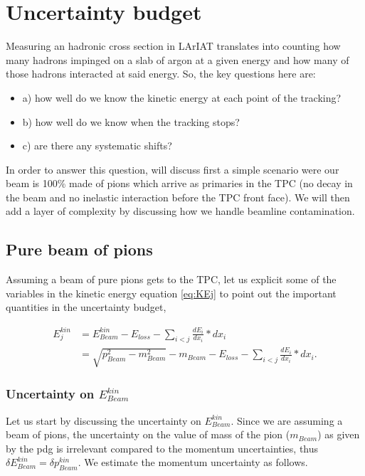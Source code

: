\chapter{Uncertainty budget}\label{ch:Uncertainty}
Measuring an hadronic cross section  in LArIAT translates into counting how many hadrons impinged on a slab of argon at a given energy and how many of those hadrons interacted at said energy. So, the key questions here are:
\begin{itemize}
\item[]a) how well do we know the kinetic energy at each point of the tracking? %
\item[]b) how well do we know when the tracking stops? %
\item[]c) are there any systematic shifts?
\end{itemize}

In order to answer this question, will discuss first a simple scenario  were our beam is 100\% made of pions which arrive as primaries in the TPC (no decay in the beam and no inelastic interaction before the TPC front face). We will then add a layer of complexity by discussing how we handle beamline contamination.

\section{Pure beam of pions}
Assuming a beam of pure pions gets to the TPC, let us explicit some of the variables in the kinetic energy equation \ref{eq:KEj}  to point out the important quantities in the uncertainty budget,

\begin{align}
 E_{j}^{kin} &=  E_{Beam}^{kin}  - E_{loss} - \sum_{i < j} \frac {dE_i}{dx_i}*dx_i\\
                  &=  \sqrt{p^2_{Beam} - m^2_{Beam}} - m_{Beam} - E_{loss} - \sum_{i < j} \frac {dE_i}{dx_i}*dx_i.
\end{align}

\subsection{Uncertainty on $E_{Beam}^{kin}$}
Let us start by discussing the uncertainty on $E_{Beam}^{kin}$. Since we are assuming a beam of pions, the uncertainty on the value of mass of the pion ($m_{Beam}$) as given by the pdg is irrelevant compared to the momentum uncertainties, thus $\delta E_{Beam}^{kin} = \delta p_{Beam}^{kin}$. 
We estimate the momentum uncertainty as follows.


